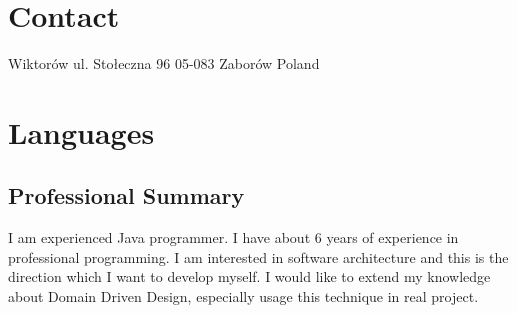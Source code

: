 \documentclass[]{friggeri-cv} %
\begin{document}
	
	\begin{aside}
		\section{Contact}
		Wiktorów
		ul. Stołeczna 96
		05-083 Zaborów
		Poland
		~
		~
		
		\section{Languages}
	\end{aside}
	
	\begin{absolutelynopagebreak}
		\section{Professional Summary}
		I am experienced Java programmer. I have about 6 years of experience in professional programming. I am interested in software architecture and this is the direction which I want to develop myself. I would like to extend my knowledge about Domain Driven Design, especially usage this technique in real project.
	\end{absolutelynopagebreak}
	
\end{document}
